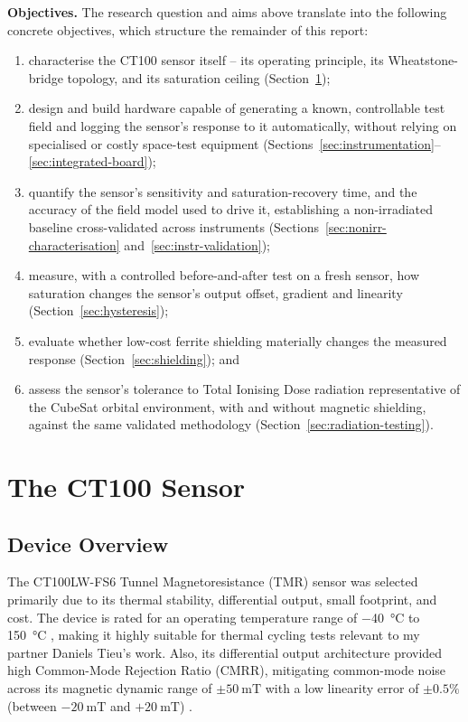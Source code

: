 \documentclass[12pt,a4paper]{article}
\begin{document}
\textbf{Objectives.} The research question and aims above translate into the following concrete objectives, which structure the remainder of this report:
\begin{enumerate}[label=(\roman*)]
\item characterise the CT100 sensor itself -- its operating principle, its Wheatstone-bridge topology, and its saturation ceiling (Section~\ref{sec:ct100});
\item design and build hardware capable of generating a known, controllable test field and logging the sensor's response to it automatically, without relying on specialised or costly space-test equipment (Sections~\ref{sec:instrumentation}--\ref{sec:integrated-board});
\item quantify the sensor's sensitivity and saturation-recovery time, and the accuracy of the field model used to drive it, establishing a non-irradiated baseline cross-validated across instruments (Sections~\ref{sec:nonirr-characterisation} and~\ref{sec:instr-validation});
\item measure, with a controlled before-and-after test on a fresh sensor, how saturation changes the sensor's output offset, gradient and linearity (Section~\ref{sec:hysteresis});
\item evaluate whether low-cost ferrite shielding materially changes the measured response (Section~\ref{sec:shielding}); and
\item assess the sensor's tolerance to Total Ionising Dose radiation representative of the CubeSat orbital environment, with and without magnetic shielding, against the same validated methodology (Section~\ref{sec:radiation-testing}).
\end{enumerate}

\section{The CT100 Sensor}
\label{sec:ct100}

\subsection{Device Overview}
\label{sec:ct100-overview}

The \mbox{CT100LW-FS6} Tunnel Magnetoresistance (TMR) sensor was selected primarily due to its thermal stability, differential output, small footprint, and cost. The device is rated for an operating temperature range of \SI{-40}{\degreeCelsius} to \SI{150}{\degreeCelsius} \cite{ct100_datasheet}, making it highly suitable for  thermal cycling  tests relevant to my partner Daniels Tieu's work. Also, its differential output architecture provided high Common-Mode Rejection Ratio (CMRR), mitigating common-mode noise across its magnetic dynamic range of $\pm50~\text{mT}$ with a low linearity error of $\pm0.5\%$ (between $-20~\text{mT}$ and $+20~\text{mT}$) \cite{ct100_datasheet}. 
\end{document}
